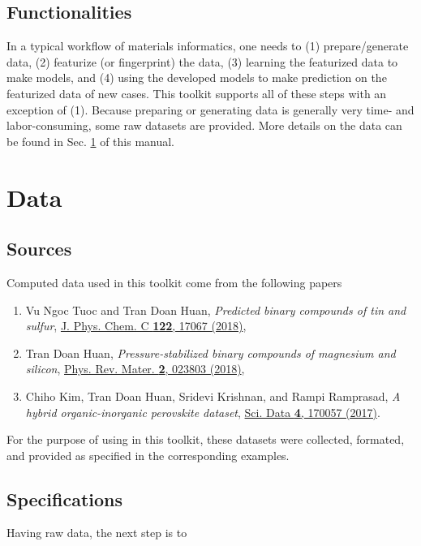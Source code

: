\documentclass[12pt]{article}
\begin{document}
\subsection{Functionalities}
In a typical workflow of materials informatics, one needs to (1) prepare/generate data, (2) featurize (or fingerprint) the data, (3) learning the featurized data to make models, and (4) using the developed models to make prediction on the featurized data of new cases. This toolkit supports all of these steps with an exception of (1). Because preparing or generating data is generally very time- and labor-consuming, some raw datasets are provided. More details on the data can be found in Sec. \ref{sec:data} of this manual. 

\section{Data}\label{sec:data}
\subsection{Sources}
Computed data used in this toolkit come from the following papers
\begin{enumerate}
  \setlength\itemsep{-0.3em}
    \item Vu Ngoc Tuoc and Tran Doan Huan, {\it Predicted binary compounds of tin and sulfur}, \href{https://pubs.acs.org/doi/abs/10.1021/acs.jpcc.8b04328}{J. Phys. Chem. C {\bf 122}, 17067 (2018)},
    \item Tran Doan Huan, {\it Pressure-stabilized binary compounds of magnesium and silicon}, \href{https://link.aps.org/doi/10.1103/PhysRevMaterials.2.023803}{Phys. Rev. Mater. {\bf 2}, 023803 (2018)},
   \item Chiho Kim, Tran Doan Huan, Sridevi Krishnan, and Rampi Ramprasad, {\it A hybrid organic-inorganic perovskite dataset}, \href{http://www.nature.com/articles/sdata201757}{Sci. Data {\bf 4}, 170057 (2017)}.
\end{enumerate}
For the purpose of using in this toolkit, these datasets were collected, formated, and provided as specified in the corresponding examples.

\subsection{Specifications}
Having raw data, the next step is to 


\end{document}
